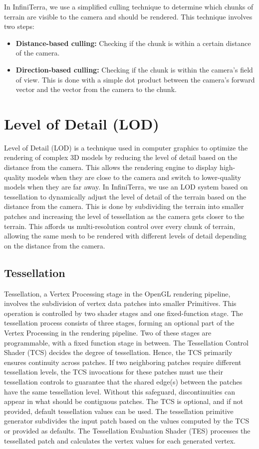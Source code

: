 \documentclass{article}
\begin{document}
In InfiniTerra, we use a simplified
culling technique to determine which chunks of terrain are visible to the camera and should be
rendered. This technique involves two steps:
\begin{itemize}
	\item \textbf{Distance-based culling:} Checking if the chunk is within a certain distance of the camera.
	\item \textbf{Direction-based culling:} Checking if the chunk is within the camera's field of view. 
	This is done with a simple dot product between the camera's forward vector and the vector from the camera to the chunk.
\end{itemize}


\section{Level of Detail (LOD)}

Level of Detail (LOD) is a technique used in computer graphics to optimize the rendering of complex
3D models by reducing the level of detail based on the distance from the camera. This allows the
rendering engine to display high-quality models when they are close to the camera and switch to
lower-quality models when they are far away. In InfiniTerra, we use an LOD system based on
tessellation to dynamically adjust the level of detail of the terrain based on the distance from
the camera. This is done by subdividing the terrain into smaller patches and increasing the level
of tessellation as the camera gets closer to the terrain. This affords us multi-resolution control
over every chunk of terrain, allowing the same mesh to be rendered with different levels of detail
depending on the distance from the camera.

\subsection{Tessellation}

Tessellation, a Vertex Processing stage in the OpenGL rendering pipeline, involves the subdivision 
of vertex data patches into smaller Primitives. This operation is controlled by two shader stages 
and one fixed-function stage. The tessellation process consists of three stages, forming an 
optional part of the Vertex Processing in the rendering pipeline. Two of these stages are 
programmable, with a fixed function stage in between. The Tessellation Control Shader (TCS) decides 
the degree of tessellation. Hence, the TCS primarily ensures continuity across patches. If two 
neighboring patches require different tessellation levels, the TCS invocations for these patches 
must use their tessellation controls to guarantee that the shared edge(s) between the patches have 
the same tessellation level. Without this safeguard, discontinuities can appear in what should be 
contiguous patches. The TCS is optional, and if not provided, default tessellation values can be 
used. The tessellation primitive generator subdivides the input patch based on the values computed 
by the TCS or provided as defaults. The Tessellation Evaluation Shader (TES) processes the 
tessellated patch and calculates the vertex values for each generated vertex.
\end{document}
